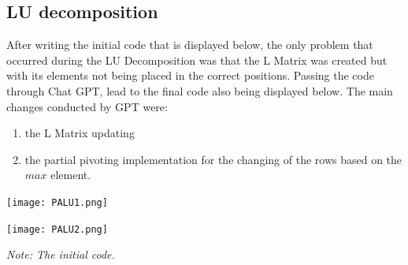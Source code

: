 \documentclass{article}
\begin{document}
\subsection{LU decomposition}
After writing the initial code that is displayed below, the only problem that occurred during the LU Decomposition was that the L Matrix was created but with its elements not being placed in the correct positions.
Passing the code through Chat GPT, lead to the final code also being displayed below. The main changes conducted by GPT were:
\begin{enumerate}
    \item the L Matrix updating
    \item the partial pivoting implementation for the changing of the rows based on the $max$ element.
    
\end{enumerate}
\begin{tcolorbox}[colback=gray!10, colframe=gray!80, sharp corners]
    \centering
    \begin{minipage}[t]{0.48\textwidth}
        \centering
        \texttt{[image: PALU1.png]}
    \end{minipage}
    \hfill
    \begin{minipage}[t]{0.48\textwidth}
        \centering
        \texttt{[image: PALU2.png]}
    \end{minipage}

    \vspace{0.5cm}
    
    \small\textit{Note: The initial code.}
\end{tcolorbox}
\end{document}
